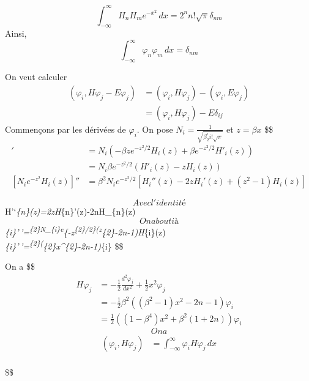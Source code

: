 \documentclass[
]{article}
\begin{document}
\[
\int_{-\infty}^{\infty} H_{n}H_{m} e^{-x^{2}} \, dx = 2^{n}n!\sqrt{ \pi }\delta_{nm} 
\] Ainsi, \[
\int_{-\infty}^{\infty} \varphi_{n}\varphi_{m} \, dx= \delta_{nm} 
\]

On veut calculer \[
\begin{align}
(\varphi_{i},H\varphi_{j}-E\varphi_{j})  & =(\varphi_{i},H\varphi_{j})-(\varphi_{i},E\varphi_{j}) \\
 & =(\varphi_{i},H\varphi_{j})-E\delta _{ij}
\end{align}
\] Commençons par les dérivées de \(\varphi_{i}\). On pose
\(N_{i}=\frac{1}{\sqrt{ \beta_{2}^{i}i!\sqrt{ \pi } }}\) et
\(z = \beta x\) \$\$ \begin{align}
[N_{i}e^{-(z)^{2}}H_{i}(z)]' & =N_{i}(-\beta ze^{-z^{2}/2}H_{i}(z)+\beta e^{-z^{2}/2}H'_{i}(z)) \\
 & =N_{i}\beta e^{-z^{2}/2}(H'_{i}(z)-zH_{i}(z)) \\
[N_{i}e^{-z^{2}}H_{i}(z)]'' & = β^{2}N_{i}​e^{−z^{2}/2}[H_{i}''​(z)−2zH_{i}'​(z)+(z^{2}−1)H_{i}​(z)]
\end{align}

\[
Avec l'identité
\] H'`\emph{\{n\}(z)=2zH}\{n\}'(z)-2nH\_\{n\}(z) \[
On abouti à
\]
\varphi\emph{\{i\}'\,'=\beta\textsuperscript{\{2\}N\_\{i\}e}\{-z\textsuperscript{\{2\}/2\}(z}\{2\}-2n-1)H}\{i\}(z)
\[
\]
\varphi\emph{\{i\}'\,'=\beta\textsuperscript{\{2\}(\beta}\{2\}x\^{}\{2\}-2n-1)\varphi}\{i\}
\$\$

On a \$\$ \begin{align}
H\varphi_{j} & = -\frac{1}{2} \frac{d^{2}\varphi_{j}}{dx^{2}} + \frac{1}{2}x^{2}\varphi_{j} \\
&=-\frac{1}{2}\beta^{2}((\beta^{2}-1)x^{2}-2n-1)\varphi_{i} \\
&= \frac{1}{2}((1-\beta^{4})x^{2}+\beta^{2}(1+2n))\varphi_{i}


\end{align} \[
On a
\] \begin{align}
(\varphi_{i},H\varphi_{j}) & =\int_{-\infty}^{\infty} \varphi_{i}H\varphi_{j} \, dx  \\

\end{align}

\$\$
\end{document}
